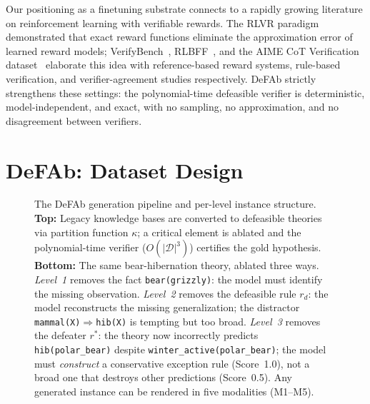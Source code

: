 \documentclass{article}
\theoremstyle{definition}
\newcommand{\D}{\mathcal{D}}
\begin{document}
Our positioning as a finetuning substrate connects to a rapidly growing literature on reinforcement learning with verifiable rewards. The RLVR paradigm~\citep{ouyang2022training} demonstrated that exact reward functions eliminate the approximation error of learned reward models; VerifyBench~\citep{zheng2025verifybench}, RLBFF~\citep{rlbff2025}, and the AIME CoT Verification dataset~\citep{wen2025aimecot} elaborate this idea with reference-based reward systems, rule-based verification, and verifier-agreement studies respectively. DeFAb strictly strengthens these settings: the polynomial-time defeasible verifier is deterministic, model-independent, and exact, with no sampling, no approximation, and no disagreement between verifiers.


\section{DeFAb: Dataset Design}\label{sec:design}

\begin{figure}[t]
\centering
\resizebox{\textwidth}{!}{}
\caption{The DeFAb generation pipeline and per-level instance structure. \textbf{Top:} Legacy knowledge bases are converted to defeasible theories via partition function $\kappa$; a critical element is ablated and the polynomial-time verifier ($O(|\D|^3)$) certifies the gold hypothesis. \textbf{Bottom:} The same bear-hibernation theory, ablated three ways. \emph{Level~1} removes the fact \texttt{bear(grizzly)}: the model must identify the missing observation. \emph{Level~2} removes the defeasible rule $r_d$: the model reconstructs the missing generalization; the distractor \texttt{mammal(X)$\Rightarrow$hib(X)} is tempting but too broad. \emph{Level~3} removes the defeater $r^*$: the theory now incorrectly predicts \texttt{hib(polar\_bear)} despite \texttt{winter\_active(polar\_bear)}; the model must \emph{construct} a conservative exception rule (Score~1.0), not a broad one that destroys other predictions (Score~0.5). Any generated instance can be rendered in five modalities (M1--M5).}
\label{fig:pipeline}
\end{figure}
\end{document}
